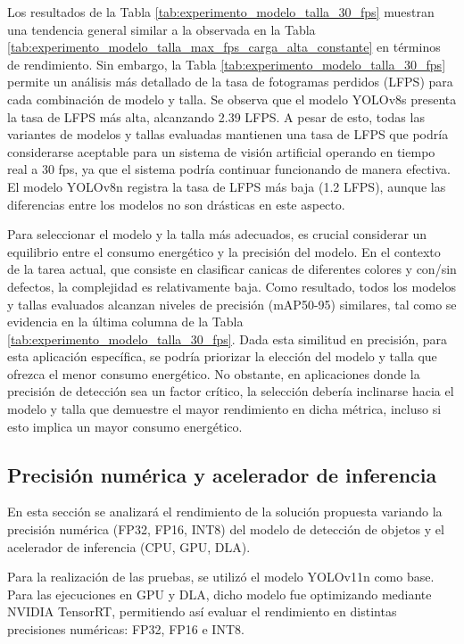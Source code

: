 \documentclass[11pt,spanish,listoffigures,listoftables]{tfgetsinf}
\begin{document}
Los resultados de la Tabla \ref{tab:experimento_modelo_talla_30_fps} muestran una tendencia general similar a la observada en la Tabla \ref{tab:experimento_modelo_talla_max_fps_carga_alta_constante} en términos de rendimiento.
Sin embargo, la Tabla \ref{tab:experimento_modelo_talla_30_fps} permite un análisis más detallado de la tasa de fotogramas perdidos (LFPS) para cada combinación de modelo y talla.
Se observa que el modelo YOLOv8s presenta la tasa de LFPS más alta, alcanzando 2.39 LFPS.
A pesar de esto, todas las variantes de modelos y tallas evaluadas mantienen una tasa de LFPS que podría considerarse aceptable para un sistema de visión artificial operando en tiempo real a 30 fps, ya que el sistema podría continuar funcionando de manera efectiva.
El modelo YOLOv8n registra la tasa de LFPS más baja (1.2 LFPS), aunque las diferencias entre los modelos no son drásticas en este aspecto.

Para seleccionar el modelo y la talla más adecuados, es crucial considerar un equilibrio entre el consumo energético y la precisión del modelo. En el contexto de la tarea actual, que consiste en clasificar canicas de diferentes colores y con/sin defectos, la complejidad es relativamente baja.
Como resultado, todos los modelos y tallas evaluados alcanzan niveles de precisión (mAP50-95) similares, tal como se evidencia en la última columna de la Tabla \ref{tab:experimento_modelo_talla_30_fps}.
Dada esta similitud en precisión, para esta aplicación específica, se podría priorizar la elección del modelo y talla que ofrezca el menor consumo energético.
No obstante, en aplicaciones donde la precisión de detección sea un factor crítico, la selección debería inclinarse hacia el modelo y talla que demuestre el mayor rendimiento en dicha métrica, incluso si esto implica un mayor consumo energético.



\subsection{Precisión numérica y acelerador de inferencia} \label{sub:precision_numerica_dispositivo}
En esta sección se analizará el rendimiento de la solución propuesta variando la precisión numérica (FP32, FP16, INT8) del modelo de detección de objetos y el acelerador de inferencia (CPU, GPU, DLA).

Para la realización de las pruebas, se utilizó el modelo YOLOv11n como base. Para las ejecuciones en GPU y DLA, dicho modelo fue optimizando mediante NVIDIA TensorRT, permitiendo así evaluar el rendimiento en distintas precisiones numéricas: FP32, FP16 e INT8.
\end{document}
